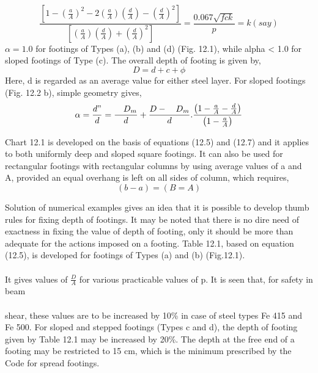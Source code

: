 \documentclass{book}
\begin{document}
\begin{equation}
\frac{\left[1-\left( \frac{a}{A} \right)^2-2\left(\frac{a}{A}\right)\left(\frac{d}{A}\right)-\left(\frac{d}{A} \right)^2 \right]}
{\left[\left(\frac{a}{A}\right)\left(\frac{d}{A}\right)+\left(\frac{d}{A}\right)^2 \right]}
=\frac{0.067\sqrt{fck}}{p}
=k(say)
\end{equation}
\newpage
$\alpha = 1.0$ for footings of Types (a), (b) and (d) (Fig. 12.1), while alpha < 1.0 for sloped footings of
Type (c). The overall depth of footing is given by,
\begin{equation}
D=d+c+\phi
\end{equation}
Here, d is regarded as an average value for either steel layer. For sloped footings (Fig. 12.2
b), simple geometry gives,
\begin{equation}
\alpha=\frac{d"}{d}=\frac{\quad{D_m}}{d}+\frac{D-\quad{D_m}}{d}.\frac{\left( 1-\frac{a}{A}-\frac{d}{A}\right)}{\left( 1-\frac{a}{A}\right)}
\end{equation}
\par Chart 12.1 is developed on the basis of equations (12.5) and (12.7) and it applies to both
uniformly deep and sloped square footings. It can also be used for rectangular footings with
rectangular columns by using average values of a and A, provided an equal overhang is left
on all sides of column, which requires,
\begin{equation}
(b-a)=(B=A)
\end{equation}
 \par Solution of numerical examples gives an idea that it is possible to develop thumb rules for ﬁxing depth of footings. It may be noted that there is no dire need of exactness in ﬁxing the value of depth of footing, only it should be more than adequate for the actions imposed on a footing. Table 12.1, based on equation (12.5), is developed for footings of Types (a) and (b) (Fig.12.1).\\\\
 It gives values of $\frac{D}{A}$ for various practicable values of p. It is seen that, for safety in beam\\ \\shear, these values are  to be increased by 10\% in case of steel types Fe 415 and Fe 500. For sloped and stepped footings (Types c and d), the depth of footing given by Table 12.1 may be increased by 20\%. The depth at the free end of a footing may be restricted to 15 cm, which is the minimum prescribed by the Code for spread footings.
 
\end{document}
